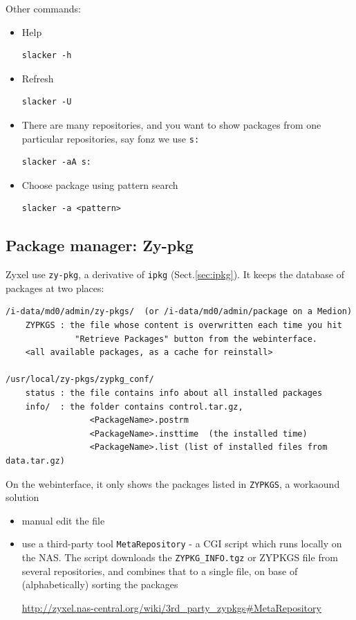 Other commands:
\begin{itemize}
  \item Help
\begin{verbatim}
slacker -h
\end{verbatim}
  \item Refresh
\begin{verbatim}
slacker -U
\end{verbatim} 

  \item There are many repositories, and you want to show packages from one
  particular repositories, say fonz we use \verb!s:!
\begin{verbatim}
slacker -aA s:
\end{verbatim}
 
   \item Choose package using pattern search
\begin{verbatim}
slacker -a <pattern>
\end{verbatim}
\end{itemize}


\subsection{Package manager: Zy-pkg}
\label{sec:zypkg}

Zyxel use \verb!zy-pkg!, a derivative of \verb!ipkg! (Sect.\ref{sec:ipkg}).
It keeps the database of packages at two places:
\begin{verbatim}
/i-data/md0/admin/zy-pkgs/  (or /i-data/md0/admin/package on a Medion)
    ZYPKGS : the file whose content is overwritten each time you hit
              "Retrieve Packages" button from the webinterface.
    <all available packages, as a cache for reinstall>

/usr/local/zy-pkgs/zypkg_conf/ 
    status : the file contains info about all installed packages
    info/  : the folder contains control.tar.gz, 
                 <PackageName>.postrm
                 <PackageName>.insttime  (the installed time)
                 <PackageName>.list (list of installed files from data.tar.gz)
\end{verbatim}

On the webinterface, it only shows the packages listed in \verb!ZYPKGS!, a
workaound solution
\begin{itemize}
  \item manual edit the file
  \item use a third-party tool \verb!MetaRepository! - a CGI script which runs
  locally on the NAS. The script downloads the \verb!ZYPKG_INFO.tgz! or ZYPKGS
  file from several repositories, and combines that to a single file, on base of (alphabetically) sorting the packages
  
  \url{http://zyxel.nas-central.org/wiki/3rd_party_zypkgs#MetaRepository}
\end{itemize}

